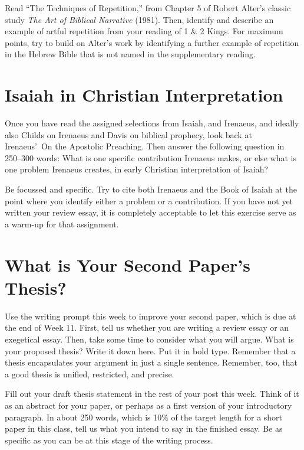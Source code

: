 \documentclass[12pt]{article}
\begin{document}
Read “The Techniques of Repetition,” from Chapter 5 of Robert Alter’s classic study \emph{The Art of Biblical Narrative} (1981). Then, identify and describe an example of artful repetition from your reading of 1 \& 2 Kings. For maximum points, try to build on Alter’s work by identifying a further example of repetition in the Hebrew Bible that is not named in the supplementary reading.


\section{Isaiah in Christian Interpretation}

Once you have read the assigned selections from Isaiah, and Irenaeus, and ideally also Childs on Irenaeus and Davis on biblical prophecy, look back at Irenaeus’ On the Apostolic Preaching. Then answer the following question in 250–300 words: What is one specific contribution Irenaeus makes, or else what is one problem Irenaeus creates, in early Christian interpretation of Isaiah?

Be focussed and specific. Try to cite both Irenaeus and the Book of Isaiah at the point where you identify either a problem or a contribution. If you have not yet written your review essay, it is completely acceptable to let this exercise serve as a warm-up for that assignment.

%

\section{What is Your Second Paper’s Thesis?}

Use the writing prompt this week to improve your second paper, which is due at the end of Week 11. First, tell us whether you are writing a review essay or an exegetical essay. Then, take some time to consider what you will argue. What is your proposed thesis? Write it down here. Put it in bold type. Remember that a thesis encapsulates your argument in just a single sentence. Remember, too, that a good thesis is unified, restricted, and precise.

Fill out your draft thesis statement in the rest of your post this week. Think of it as an abstract for your paper, or perhaps as a first version of your introductory paragraph. In about 250 words, which is 10\% of the target length for a short paper in this class, tell us what you intend to say in the finished essay. Be as specific as you can be at this stage of the writing process.
\end{document}

